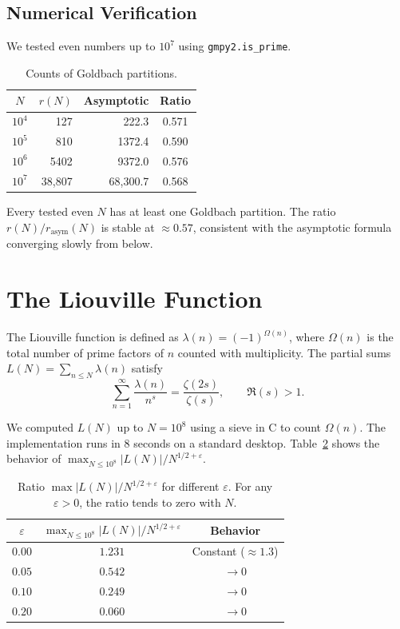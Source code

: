 \documentclass[12pt,a4paper]{article}
\theoremstyle{plain}
\begin{document}
\subsection{Numerical Verification}

We tested even numbers up to $10^7$ using {\tt gmpy2.is\_prime}.

\begin{table}[htbp]
\centering
\caption{Counts of Goldbach partitions.}
\label{tab:goldbach}
\begin{tabular}{crrc}
\hline
$N$ & $r(N)$ & Asymptotic & Ratio \\
\hline
$10^4$ & 127 & 222.3 & 0.571 \\
$10^5$ & 810 & 1372.4 & 0.590 \\
$10^6$ & 5402 & 9372.0 & 0.576 \\
$10^7$ & 38,807 & 68,300.7 & 0.568 \\
\hline
\end{tabular}
\end{table}

Every tested even $N$ has at least one Goldbach partition.
The ratio $r(N)/r_{\text{asym}}(N)$ is stable at $\approx0.57$,
consistent with the asymptotic formula converging slowly from below.

\section{The Liouville Function}
\label{sec:liouville}

The Liouville function is defined as $\lambda(n)=(-1)^{\Omega(n)}$,
where $\Omega(n)$ is the total number of prime factors of $n$
counted with multiplicity. The partial sums
$L(N)=\sum_{n\le N}\lambda(n)$ satisfy
\[
\sum_{n=1}^{\infty}\frac{\lambda(n)}{n^{s}} = \frac{\zeta(2s)}{\zeta(s)},\qquad
\Re(s)>1.
\]

We computed $L(N)$ up to $N=10^{8}$ using a sieve in C to count
$\Omega(n)$. The implementation runs in 8 seconds on a standard
desktop. Table~\ref{tab:liouville_cota} shows the behavior of
$\max_{N\le10^{8}}|L(N)|/N^{1/2+\varepsilon}$.

\begin{table}[htbp]
\centering
\begin{tabular}{c c c}
\hline
$\varepsilon$ & $\max_{N\le10^{8}}|L(N)|/N^{1/2+\varepsilon}$ & Behavior \\
\hline
$0.00$ & $1.231$ & Constant ($\approx1.3$) \\
$0.05$ & $0.542$ & $\to0$ \\
$0.10$ & $0.249$ & $\to0$ \\
$0.20$ & $0.060$ & $\to0$ \\
\hline
\end{tabular}
\caption{Ratio $\max|L(N)|/N^{1/2+\varepsilon}$ for different $\varepsilon$.
For any $\varepsilon>0$, the ratio tends to zero with $N$.}
\label{tab:liouville_cota}
\end{table}
\end{document}
